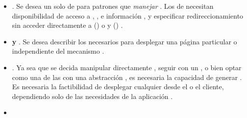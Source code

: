 \begin{itemize}
	\item
		\textbf{\routingAS}. Se desea un solo \setPL de \routesPC para \mapCPT patrones \uriNAME que \textit{manejar} \routePC. Los \handlersAS de \routePC necesitan disponibilidad de acceso a \httpNAME \headersINT, \cookiesINT, e información \uriNAME, y especificar redireccionamiento sin acceder directamente a \windowLocationINT(\browserINT) o \reqNodeINT y \resNodeINT (\nodejsNAME) \cite{online_isom_js_future_web_apps}.
	\item
		\textbf{\fetchingPC y \persistingPC \dataPC}. Se desea describir los \resourcesCPT necesarios para desplegar una página particular o \componentAS independiente del mecanismo \fetchingPC \cite{online_isom_js_future_web_apps}.
	\item
		\textbf{\viewRenderingAS}. Ya sea que se decida manipular directamente \htmldomNAME, seguir con un \templatingAS \htmlNAME \stringBasePL, o bien optar como una de las \componentsAS \uiSiglaAS con una abstracción \htmldomNAME, es necesaria la capacidad de generar \markupPL \isomorphicallyAS. Es necesaria la factibilidad de desplegar cualquier \viewAS desde el \serverAS o el cliente, dependiendo solo de las necesidades de la aplicación \cite{online_isom_js_future_web_apps}.
	\item

\end{itemize}
